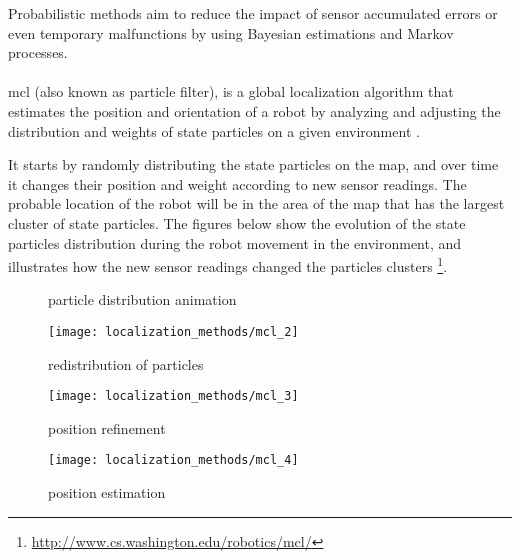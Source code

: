 Probabilistic methods aim to reduce the impact of sensor accumulated errors or even temporary malfunctions by using Bayesian estimations and Markov processes.

\paragraph{}

\gls{mcl} (also known as particle filter), is a global localization algorithm that estimates the position and orientation of a robot by analyzing and adjusting the distribution and weights of state particles on a given environment \cite{Bshara2010,Arulampalam2002,Blanco2010,Chen2003b,Fox1999,Saito2009}.

It starts by randomly distributing the state particles on the map, and over time it changes their position and weight according to new sensor readings. The probable location of the robot will be in the area of the map that has the largest cluster of state particles. The figures below show the evolution of the state particles distribution during the robot movement in the environment, and illustrates how the new sensor readings changed the particles clusters \footnote{\url{http://www.cs.washington.edu/robotics/mcl/}}.

\begin{figure}[h]
	\centering
	\begin{minipage}[h]{.49\textwidth}
		\centering
		\caption{ particle distribution animation}
		\label{fig:localization-methods_mcl1}
	\end{minipage}\hfill
	\begin{minipage}[h]{.49\textwidth}
		\centering
		\texttt{[image: localization\_methods/mcl\_2]}
		\caption{ redistribution of particles}
		\label{fig:localization-methods_mcl2}
	\end{minipage}
\end{figure}

\begin{figure}[h]
	\centering
	\begin{minipage}[h]{.49\textwidth}
		\centering
		\texttt{[image: localization\_methods/mcl\_3]}
		\caption{ position refinement}
		\label{fig:localization-methods_mcl3}
	\end{minipage}\hfill
	\begin{minipage}[h]{.49\textwidth}
		\centering
		\texttt{[image: localization\_methods/mcl\_4]}
		\caption{ position estimation}
		\label{fig:localization-methods_mcl4}
	\end{minipage}
\end{figure}


